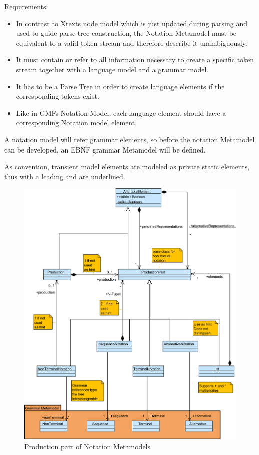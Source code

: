 Requirements:
\begin{itemize}
	\item In contrast to Xtexts node model which is just updated during parsing and used to guide parse tree construction, the Notation Metamodel must be equivalent to a valid token stream and therefore describe it unambiguously. 
	\item It must contain or refer to all information necessary to create a specific token stream together with a language model and a grammar model.   
	\item It has to be a Parse Tree in order to create language elements if the corresponding tokens exist.
	\item Like in GMFs Notation Model, each language element should have a corresponding Notation model element.
\end{itemize}

A notation model will refer grammar elements, so before the notation Metamodel can be developed, an EBNF grammar Metamodel will be defined.

As convention, transient model elements are modeled as private static elements, thus with a leading \code{-} and are \underline{underlined}.

\begin{figure}
\centering
\includegraphics[scale=0.65]{gfx/ex/Notation_Prod} 
\caption{Production part of Notation Metamodels}
\label{MM:Not:Prod}
\end{figure}

